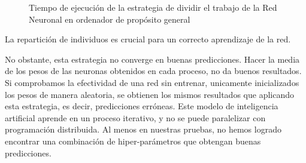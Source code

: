 			\begin{figure}[!h]
				\centering
				\caption{Tiempo de ejecución de la estrategia de dividir el trabajo de la Red Neuronal en ordenador de propósito general}
				\label{fig:redneu_estrategia2}
			\end{figure}
			

		
			
			La repartición de individuos es crucial para un correcto aprendizaje de la red. 
			
			No obstante, esta estrategia no converge en buenas predicciones. Hacer la media de los pesos de las neuronas obtenidos en cada proceso, no da buenos resultados. Si comprobamos la efectividad de una red sin entrenar, unicamente inicializados los pesos de manera aleatoria, se obtienen los mismos resultados que aplicando esta estrategia, es decir, predicciones erróneas. Este modelo de inteligencia artificial aprende en un proceso iterativo, y no se puede paralelizar con programación distribuida. Al menos en nuestras pruebas, no hemos logrado encontrar una combinación de hiper-parámetros que obtengan buenas predicciones.
			
			